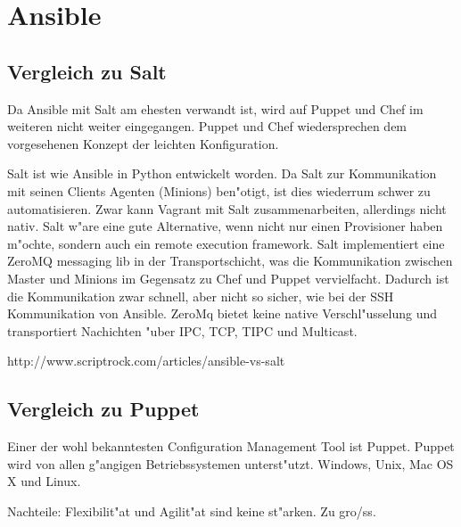 \section{Ansible}

\subsection{Vergleich zu Salt}
Da Ansible mit Salt am ehesten verwandt ist, wird auf Puppet und Chef im weiteren nicht weiter eingegangen.
Puppet und Chef wiedersprechen dem vorgesehenen Konzept der leichten Konfiguration.

Salt ist wie Ansible in Python entwickelt worden. Da Salt zur Kommunikation mit seinen Clients Agenten (Minions) ben"otigt, ist dies wiederrum schwer zu automatisieren. Zwar kann Vagrant mit Salt zusammenarbeiten, allerdings nicht nativ. Salt w"are eine gute Alternative, wenn nicht nur einen Provisioner haben m"ochte, sondern auch ein remote execution framework.
Salt implementiert eine ZeroMQ messaging lib in der Transportschicht, was die Kommunikation zwischen Master und Minions im Gegensatz zu Chef und Puppet vervielfacht. Dadurch ist die Kommunikation zwar schnell, aber nicht so sicher, wie bei der SSH Kommunikation von Ansible. 
ZeroMq bietet keine native Verschl"usselung und transportiert Nachichten "uber IPC, TCP, TIPC und Multicast.

http://www.scriptrock.com/articles/ansible-vs-salt

\subsection{Vergleich zu Puppet}
Einer der wohl bekanntesten Configuration Management Tool ist Puppet.
Puppet wird von allen g"angigen Betriebssystemen unterst"utzt. Windows, Unix, Mac OS X und Linux. 

Nachteile: Flexibilit"at und Agilit"at sind keine st"arken. Zu gro{/ss}. 
